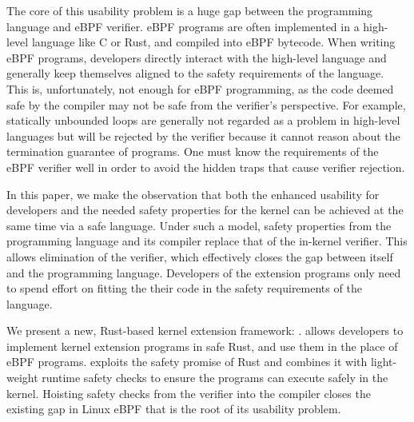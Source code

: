 
The core of this usability problem is a huge gap between the programming
    language and eBPF verifier.
eBPF programs are often implemented in a high-level language like C or Rust,
    and compiled into eBPF bytecode. 
When writing eBPF programs, developers directly interact with the high-level
    language and generally keep themselves aligned to the safety requirements
    of the language.
This is, unfortunately, not enough for eBPF programming, as the code deemed
    safe by the compiler may not be safe from the verifier's perspective.
For example, statically unbounded loops are generally not regarded as a problem
    in high-level languages but will be rejected by the verifier because it
    cannot reason about the termination guarantee of programs.
One must know the requirements of the eBPF verifier well in order to
    avoid the hidden traps that cause verifier rejection.


In this paper, we make the observation that both the enhanced usability for
    developers and the needed safety properties for the kernel can be achieved
    at the same time via a safe language.
Under such a model, safety properties from the programming language and its
    compiler replace that of the in-kernel verifier.
This allows elimination of the verifier, which effectively closes the gap
    between itself and the programming language.
Developers of the extension programs only need to spend effort on fitting the
    their code in the safety requirements of the language.

We present a new, Rust-based kernel extension framework: \projname{}.
\projname{} allows developers to implement kernel extension programs in safe
    Rust, and use them in the place of eBPF programs.
\projname{} exploits the safety promise of Rust and combines it with
    light-weight runtime safety checks to ensure the programs can execute
    safely in the kernel.
Hoisting safety checks from the verifier into the compiler closes the existing 
    gap in Linux eBPF that is the root of its usability problem.

